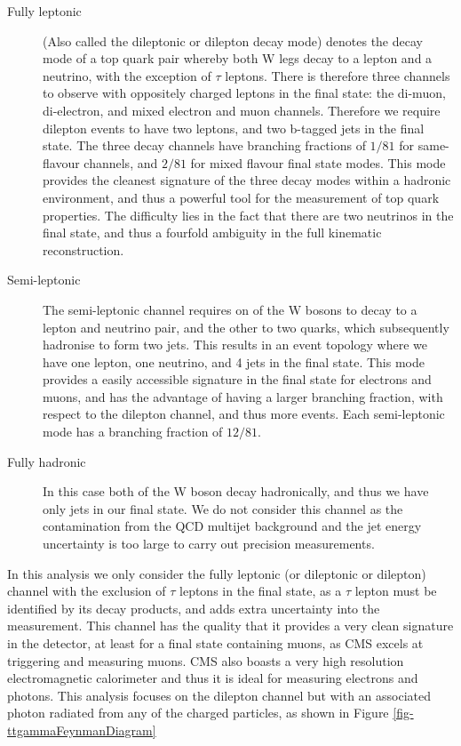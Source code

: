 \begin{description}
	\item[Fully leptonic] (Also called the dileptonic or dilepton decay mode) denotes the decay mode of a top quark pair whereby both W legs decay to a lepton and a neutrino, with the exception of $\tau$ leptons. There is therefore three channels to observe with oppositely charged leptons in the final state: the di-muon, di-electron, and mixed electron and muon channels. Therefore we require dilepton events to have two leptons, and two b-tagged jets in the final state. The three decay channels have branching fractions of $1/81$ for same-flavour channels, and $2/81$ for mixed flavour final state modes. This mode provides the cleanest signature of the three decay modes within a hadronic environment, and thus a powerful tool for the measurement of top quark properties. The difficulty lies in the fact that there are two neutrinos in the final state, and thus a fourfold ambiguity in the full kinematic reconstruction.
	\item[Semi-leptonic] The semi-leptonic channel requires on of the W bosons to decay to a lepton and neutrino pair, and the other to two quarks, which subsequently hadronise to form two jets. This results in an event topology where we have one lepton, one neutrino, and 4 jets in the final state. This mode provides a easily accessible signature in the final state for electrons and muons, and has the advantage of having a larger branching fraction, with respect to the dilepton channel, and thus more events. Each semi-leptonic mode has a branching fraction of $12/81$.
	\item[Fully hadronic] In this case both of the W boson decay hadronically, and thus we have only jets in our final state. We do not consider this channel as the contamination from the QCD multijet background and the jet energy uncertainty is too large to carry out precision measurements. 
\end{description}

In this analysis we only consider the fully leptonic (or dileptonic or dilepton) channel with the exclusion of $\tau$ leptons in the final state, as a $\tau$ lepton must be identified by its decay products, and adds extra uncertainty into the measurement. This channel has the quality that it provides a very clean signature in the detector, at least for a final state containing muons, as CMS excels at triggering and measuring muons. CMS also boasts a very high resolution electromagnetic calorimeter and thus it is ideal for measuring electrons and photons. This analysis focuses on the dilepton channel but with an associated photon radiated from any of the charged particles, as shown in Figure \ref{fig-ttgammaFeynmanDiagram}

